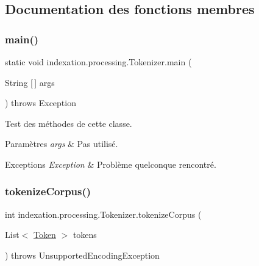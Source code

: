\subsection{Documentation des fonctions membres}
\mbox{\label{classindexation_1_1processing_1_1Tokenizer_ab24de26039cb3c92fc4697f86fc4b0e3}} 
\subsubsection{\texorpdfstring{main()}{main()}}
{\footnotesize\ttfamily static void indexation.\+processing.\+Tokenizer.\+main (\begin{DoxyParamCaption}\item[{String \mbox{[}$\,$\mbox{]}}]{args }\end{DoxyParamCaption}) throws Exception\hspace{0.3cm}{\ttfamily [static]}}

Test des méthodes de cette classe.


\begin{DoxyParams}{Paramètres}
{\em args} & Pas utilisé.\\
\hline
\end{DoxyParams}

\begin{DoxyExceptions}{Exceptions}
{\em Exception} & Problème quelconque rencontré. \\
\hline
\end{DoxyExceptions}
\mbox{\label{classindexation_1_1processing_1_1Tokenizer_a6efa197da7bf96fe0758c421d23a3a7f}} 
\subsubsection{\texorpdfstring{tokenize\+Corpus()}{tokenizeCorpus()}}
{\footnotesize\ttfamily int indexation.\+processing.\+Tokenizer.\+tokenize\+Corpus (\begin{DoxyParamCaption}\item[{List$<$ \hyperlink{classindexation_1_1content_1_1Token}{Token} $>$}]{tokens }\end{DoxyParamCaption}) throws Unsupported\+Encoding\+Exception}

